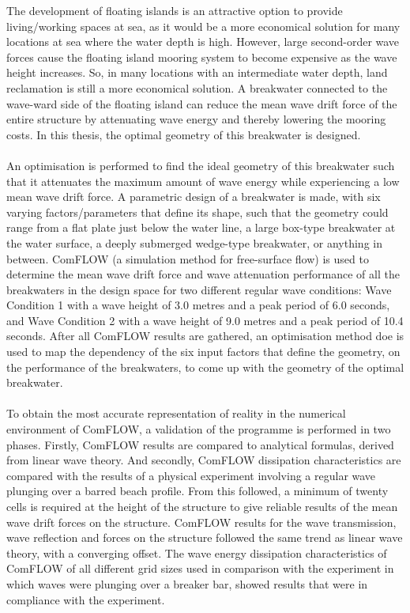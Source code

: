 The development of floating islands is an attractive option to provide living/working spaces at sea, as it would be a more economical solution for many locations at sea where the water depth is high. However, large second-order wave forces cause the floating island mooring system to become expensive as the wave height increases. So, in many locations with an intermediate water depth, land reclamation is still a more economical solution. A breakwater connected to the wave-ward side of the floating island can reduce the mean wave drift force of the entire structure by attenuating wave energy and thereby lowering the mooring costs. In this thesis, the optimal geometry of this breakwater is designed.\\
\\
An optimisation is performed to find the ideal geometry of this breakwater such that it attenuates the maximum amount of wave energy while experiencing a low mean wave drift force. A parametric design of a breakwater is made, with six varying factors/parameters that define its shape, such that the geometry could range from a flat plate just below the water line, a large box-type breakwater at the water surface, a deeply submerged wedge-type breakwater, or anything in between. ComFLOW (a simulation method for free-surface flow) is used to determine the mean wave drift force and wave attenuation performance of all the breakwaters in the design space for two different regular wave conditions: Wave Condition 1 with a wave height of 3.0 metres and a peak period of 6.0 seconds, and Wave Condition 2 with a wave height of 9.0 metres and a peak period of 10.4 seconds. After all ComFLOW results are gathered, an optimisation method \acrfull{doe} is used to map the dependency of the six input factors that define the geometry, on the performance of the breakwaters, to come up with the geometry of the optimal breakwater. \\
\\
To obtain the most accurate representation of reality in the numerical environment of ComFLOW, a validation of the programme is performed in two phases. Firstly, ComFLOW results are compared to analytical formulas, derived from linear wave theory. And secondly, ComFLOW dissipation characteristics are compared with the results of a physical experiment involving a regular wave plunging over a barred beach profile. From this followed, a minimum of twenty cells is required at the height of the structure to give reliable results of the mean wave drift forces on the structure. ComFLOW results for the wave transmission, wave reflection and forces on the structure followed the same trend as linear wave theory, with a converging offset. The wave energy dissipation characteristics of ComFLOW of all different grid sizes used in comparison with the experiment in which waves were plunging over a breaker bar, showed results that were in compliance with the experiment.\\
